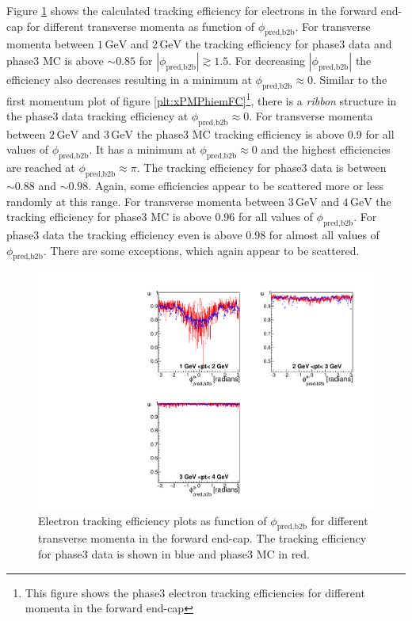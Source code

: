 \documentclass[a4paper,11pt,twosided,final,german,openbib,pdftex,listof=totoc,bibliography=totoc]{scrbook}
\begin{document}
Figure \ref{plt:xPtMPhiemFC3} shows the calculated tracking efficiency for electrons in the forward end-cap for different transverse momenta as function of $\phi_{\textrm{pred,b2b}}$. 
For transverse momenta between $1\,\textrm{GeV}$ and $2\,\textrm{GeV}$ the tracking efficiency for phase3 data and phase3 MC is above $\sim 0.85$ for $|\phi_{\textrm{pred,b2b}}| \gtrsim 1.5$. For decreasing $|\phi_{\textrm{pred,b2b}}|$ the efficiency also decreases resulting in a minimum at $\phi_{\textrm{pred,b2b}} \approx 0$. Similar to the first momentum plot of figure \ref{plt:xPMPhiemFC}\footnote{This figure shows the phase3 electron tracking efficiencies for different momenta in the forward end-cap}, there is a \textit{ribbon} structure in the phase3 data tracking efficiency at $\phi_{\textrm{pred,b2b}} \approx 0$.
For transverse momenta between $2\,\textrm{GeV}$ and $3\,\textrm{GeV}$ the phase3 MC tracking efficiency is above 0.9 for all values of $\phi_{\textrm{pred,b2b}}$. It has a minimum at $\phi_{\textrm{pred,b2b}} \approx 0$ and the highest efficiencies are reached at $\phi_{\textrm{pred,b2b}} \approx \pi$. The tracking efficiency for phase3 data is between $\sim 0.88$ and $\sim 0.98$. Again, some efficiencies appear to be scattered more or less randomly at this range. 
For transverse momenta between $3\,\textrm{GeV}$ and $4\,\textrm{GeV}$ the tracking efficiency for phase3 MC is above 0.96 for all values of $\phi_{\textrm{pred,b2b}}$. For phase3 data the tracking efficiency even is above 0.98 for almost all values of $\phi_{\textrm{pred,b2b}}$. There are some exceptions, which again appear to be scattered.


\begin{figure}[!htbp]
	\centering
	\includegraphics[width=\textwidth]{Plots/master3/xPtMPhiemFCP3}
	\caption[Transverse Momentum $\phi_{\textrm{pred,b2b}}$ Electron Forward End-Cap Efficiency Phase3]{Electron tracking efficiency plots as function of $\phi_{\textrm{pred,b2b}}$ for different transverse momenta in the forward end-cap. The tracking efficiency for phase3 data is shown in blue and phase3 MC in red.}
	\label{plt:xPtMPhiemFC3}
\end{figure}
\end{document}
